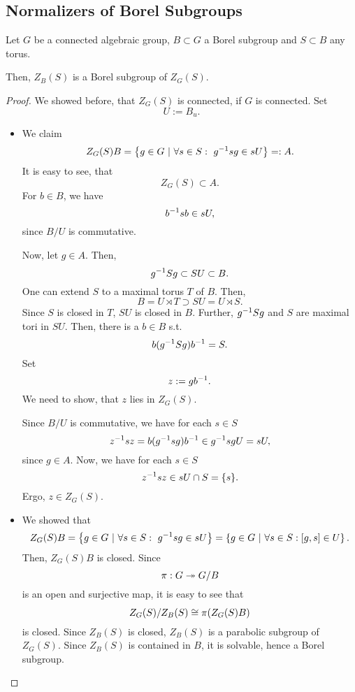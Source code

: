 \subsection{Normalizers of Borel Subgroups}

\begin{lemma}
	Let $G$ be a connected algebraic group, $B \subset G$ a Borel subgroup and $S \subset B$ any torus.
	
	Then, $Z_B(S)$ is a Borel subgroup of $Z_G(S)$.
\end{lemma}
\begin{proof}
	We showed before, that $Z_G(S)$ is connected, if $G$ is connected.
	Set
	\[ U:= B_u. \]
	\begin{itemize}
		\item We claim
		\[ Z_G(S) B = \left\lbrace g \in G ~ | ~ \forall s \in S:~g^{-1} s g \in sU\right\rbrace =:A. \]
		It is easy to see, that
		\[ Z_G(S) \subset A. \]
		For $b \in B$, we have
		\[ b^{-1} sb\in sU, \]
		since $B/U$ is commutative.
		
		Now, let $g \in A$. Then,
		\[ g^{-1} S g \subset SU \subset B. \]
		One can extend $S$ to a maximal torus $T$ of $B$. Then,
		\[ B = U \rtimes T \supset SU = U \rtimes S.\]
Since $S$ is closed in $T$, $SU$ is closed in $B$. Further, $g^{-1} S g$ and $S$ are maximal tori in $SU$. Then, there is a $b \in B$ s.t.
\[ b(g^{-1} S g)b^{-1} = S. \]
Set
\[ z:= gb^{-1}. \]
We need to show, that $z$ lies in $Z_G(S)$.

Since $B/U$ is commutative, we have for each $s \in S$
\[ z^{-1} s z = b(g^{-1} s g)b^{-1} \in g^{-1} s g U= sU, \]
since $g \in A$.
Now, we have for each $s \in S$
\[ z^{-1} s z \in sU \cap S = \{s\}.  \]
Ergo, $z \in Z_G(S)$.
\item We showed that
\[ Z_G(S) B = \left\lbrace g \in G ~ | ~ \forall s \in S:~g^{-1} s g \in sU\right\rbrace = \left\lbrace g \in G ~ | ~ \forall s \in S:[g,s] \in U\right\rbrace. \]
Then, $Z_G(S)B$ is closed. Since
\[ \pi : G \overset{}{\twoheadrightarrow} G/B \]
is an open and surjective map, it is easy to see that
\[ Z_G(S) / Z_B(S) \overset{}{\cong} \pi(Z_G(S)B) \]
is closed. Since $Z_B(S)$ is closed, $Z_B(S)$ is a parabolic subgroup of $Z_G(S)$. Since $Z_B(S)$ is contained in $B$, it is solvable, hence a Borel subgroup.
	\end{itemize}
\end{proof}

